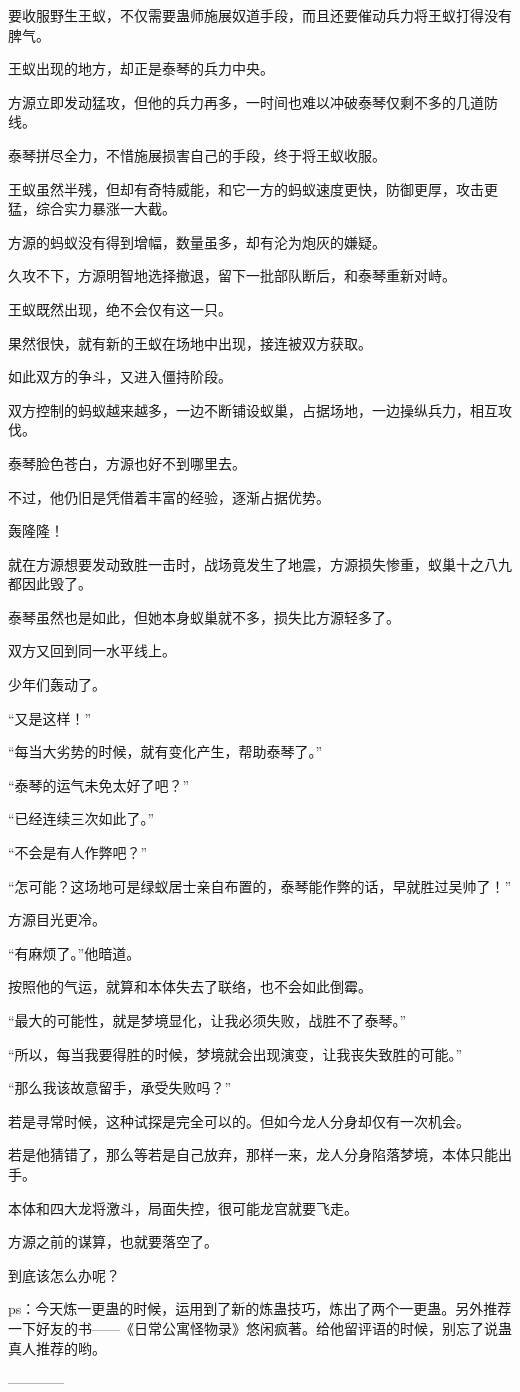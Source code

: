 \begin{this_body}
要收服野生王蚁，不仅需要蛊师施展奴道手段，而且还要催动兵力将王蚁打得没有脾气。

王蚁出现的地方，却正是泰琴的兵力中央。

方源立即发动猛攻，但他的兵力再多，一时间也难以冲破泰琴仅剩不多的几道防线。

泰琴拼尽全力，不惜施展损害自己的手段，终于将王蚁收服。

王蚁虽然半残，但却有奇特威能，和它一方的蚂蚁速度更快，防御更厚，攻击更猛，综合实力暴涨一大截。

方源的蚂蚁没有得到增幅，数量虽多，却有沦为炮灰的嫌疑。

久攻不下，方源明智地选择撤退，留下一批部队断后，和泰琴重新对峙。

王蚁既然出现，绝不会仅有这一只。

果然很快，就有新的王蚁在场地中出现，接连被双方获取。

如此双方的争斗，又进入僵持阶段。

双方控制的蚂蚁越来越多，一边不断铺设蚁巢，占据场地，一边操纵兵力，相互攻伐。

泰琴脸色苍白，方源也好不到哪里去。

不过，他仍旧是凭借着丰富的经验，逐渐占据优势。

轰隆隆！

就在方源想要发动致胜一击时，战场竟发生了地震，方源损失惨重，蚁巢十之八九都因此毁了。

泰琴虽然也是如此，但她本身蚁巢就不多，损失比方源轻多了。

双方又回到同一水平线上。

少年们轰动了。

“又是这样！”

“每当大劣势的时候，就有变化产生，帮助泰琴了。”

“泰琴的运气未免太好了吧？”

“已经连续三次如此了。”

“不会是有人作弊吧？”

“怎可能？这场地可是绿蚁居士亲自布置的，泰琴能作弊的话，早就胜过吴帅了！”

方源目光更冷。

“有麻烦了。”他暗道。

按照他的气运，就算和本体失去了联络，也不会如此倒霉。

“最大的可能性，就是梦境显化，让我必须失败，战胜不了泰琴。”

“所以，每当我要得胜的时候，梦境就会出现演变，让我丧失致胜的可能。”

“那么我该故意留手，承受失败吗？”

若是寻常时候，这种试探是完全可以的。但如今龙人分身却仅有一次机会。

若是他猜错了，那么等若是自己放弃，那样一来，龙人分身陷落梦境，本体只能出手。

本体和四大龙将激斗，局面失控，很可能龙宫就要飞走。

方源之前的谋算，也就要落空了。

到底该怎么办呢？

ps：今天炼一更蛊的时候，运用到了新的炼蛊技巧，炼出了两个一更蛊。另外推荐一下好友的书——《日常公寓怪物录》悠闲疯著。给他留评语的时候，别忘了说蛊真人推荐的哟。

------------

\end{this_body}

